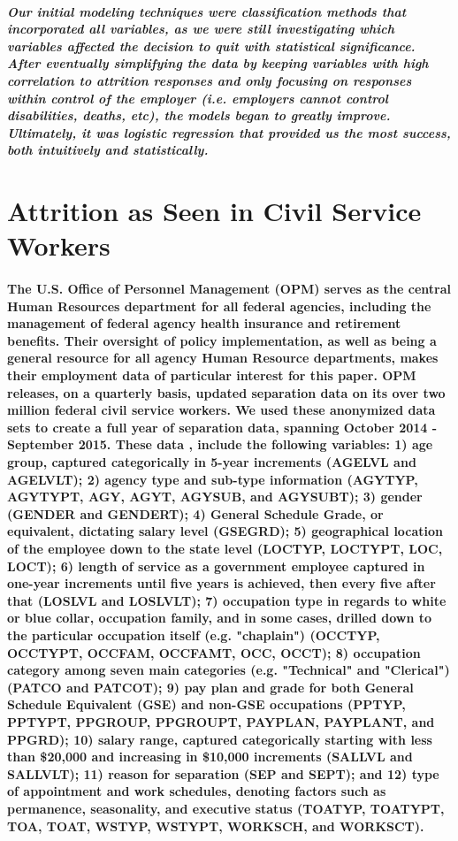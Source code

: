 \documentclass[10pt]{article}
\begin{document}
\subparagraph{Our initial modeling techniques were classification methods that incorporated all variables, as we were still investigating which variables affected the decision to quit with statistical significance.  After eventually simplifying the data by keeping variables with high correlation to attrition responses and only focusing on responses within control of the employer (i.e. employers cannot control disabilities, deaths, etc), the models began to greatly improve.  Ultimately, it was logistic regression that provided us the most success, both intuitively and statistically.}

\section{Attrition as Seen in Civil Service Workers}

\paragraph{The U.S. Office of Personnel Management (OPM) serves as the central Human Resources department for all federal agencies, including the management of federal agency health insurance and retirement benefits. Their oversight of policy implementation, as well as being a general resource for all agency Human Resource departments, makes their employment data of particular interest for this paper. OPM releases, on a quarterly basis, updated separation data on its over two million federal civil service workers.  We used these anonymized data sets to create a full year of separation data, spanning October 2014 - September 2015.   These data \cite{opm}, include the following variables: 1) age group, captured categorically in 5-year increments (AGELVL and AGELVLT); 2) agency type and sub-type information (AGYTYP, AGYTYPT, AGY, AGYT, AGYSUB, and AGYSUBT); 3) gender (GENDER and GENDERT); 4) General Schedule Grade, or equivalent, dictating salary level (GSEGRD); 5) geographical location of the employee down to the state level (LOCTYP, LOCTYPT, LOC, LOCT); 6) length of service as a government employee captured in one-year increments until five years is achieved, then every five after that (LOSLVL and LOSLVLT); 7) occupation type  in regards to white or blue collar, occupation family, and in some cases, drilled down to the particular occupation itself (e.g. "chaplain") (OCCTYP, OCCTYPT, OCCFAM, OCCFAMT, OCC, OCCT); 8) occupation category among seven main categories (e.g. "Technical" and "Clerical") (PATCO and PATCOT); 9) pay plan and grade for both General Schedule Equivalent (GSE) and non-GSE occupations (PPTYP, PPTYPT, PPGROUP, PPGROUPT, PAYPLAN, PAYPLANT, and PPGRD); 10) salary range, captured categorically starting with less than \$20,000 and increasing in \$10,000 increments (SALLVL and SALLVLT); 11) reason for separation (SEP and SEPT); and 12) type of appointment and work schedules, denoting factors such as permanence, seasonality, and executive status (TOATYP, TOATYPT, TOA, TOAT, WSTYP, WSTYPT, WORKSCH, and WORKSCT).}
\end{document}
